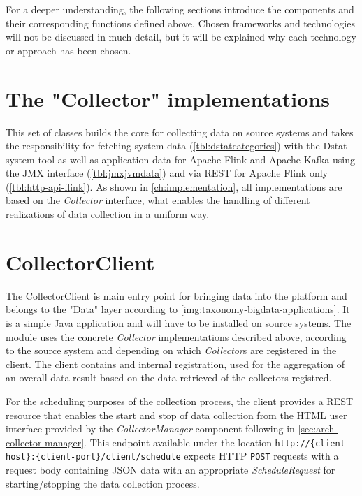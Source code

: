 For a deeper understanding, the following sections introduce the components and their corresponding functions defined above.
Chosen frameworks and technologies will not be discussed in much detail, but it will be explained why each technology or
approach has been chosen.


\section{The "Collector" implementations}

This set of classes builds the core for collecting data on source systems and takes the responsibility for fetching
system data (\autoref{tbl:dstatcategories}) with the Dstat system tool as well as application data for Apache Flink
and Apache Kafka using the JMX interface (\autoref{tbl:jmxjvmdata}) and via REST for Apache Flink only
(\autoref{tbl:http-api-flink}). As shown in \autoref{ch:implementation}, all implementations are based on the
\textit{Collector} interface, what enables the handling of different realizations of data collection in a uniform way.

\section{CollectorClient}

The CollectorClient is main entry point for bringing data into the platform and belongs to the "Data" layer according to
\autoref{img:taxonomy-bigdata-applications}. It is a simple Java application and will have to be installed on source systems.
The module uses the concrete \textit{Collector} implementations described above, according to the source system and
depending on which \textit{Collector}s are registered in the client. The client contains and internal registration, used for the
aggregation of an overall data result based on the data retrieved of the collectors registred.

For the scheduling purposes of the collection process, the client provides a REST resource that enables the start and stop of data
collection from the HTML user interface provided by the \textit{CollectorManager} component following in \autoref{sec:arch-collector-manager}.
This endpoint available under the location \verb|http://{client-host}:{client-port}/client/schedule| expects HTTP \verb|POST| requests
with a request body containing JSON data with an appropriate \textit{ScheduleRequest} for starting/stopping the data collection process.

